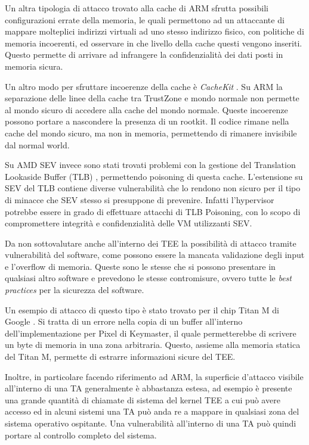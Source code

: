 \documentclass[12pt,italian]{report}
\begin{document}
	Un altra tipologia di attacco trovato alla cache di ARM \cite{aliasdriven} sfrutta possibili configurazioni errate della memoria, le quali permettono ad un attaccante di mappare molteplici indirizzi virtuali ad uno stesso indirizzo fisico, con politiche di memoria incoerenti, ed osservare in che livello della cache questi vengono inseriti. Questo permette di arrivare ad infrangere la confidenzialità dei dati posti in memoria sicura.
	
	Un altro modo per sfruttare incoerenze della cache è \textit{CacheKit} \cite{zhang2016cachekit}. Su ARM la separazione delle linee della cache tra TrustZone e mondo normale non permette al mondo sicuro di accedere alla cache del mondo normale. Queste incoerenze possono portare a nascondere la presenza di un rootkit. Il codice rimane nella cache del mondo sicuro, ma non in memoria, permettendo di rimanere invisibile dal normal world.
	
	Su AMD SEV invece sono stati trovati problemi con la gestione del Translation Lookaside Buffer (TLB) \cite{li2021tlb}, permettendo poisoning di questa cache. L'estensione su SEV del TLB contiene diverse vulnerabilità che lo rendono non sicuro per il tipo di minacce che SEV stesso si presuppone di prevenire. Infatti l'hypervisor potrebbe essere in grado di effettuare attacchi di TLB Poisoning, con lo scopo di compromettere integrità e confidenzialità delle VM utilizzanti SEV.
	
	\bigbreak 
	
	Da non sottovalutare anche all'interno dei TEE la possibilità di attacco tramite vulnerabilità del software, come possono essere la mancata validazione degli input e l'overflow di memoria. Queste sono le stesse che si possono presentare in qualsiasi altro software e prevedono le stesse contromisure, ovvero tutte le \textit{best practices} per la sicurezza del software.
	
	Un esempio di attacco di questo tipo è stato trovato per il chip Titan M di Google \cite{attack_titanM}. Si tratta di un errore nella copia di un buffer all'interno dell'implementazione per Pixel di Keymaster, il quale permetterebbe di scrivere un byte di memoria in una zona arbitraria. Questo, assieme alla memoria statica del Titan M, permette di estrarre informazioni sicure del TEE.
	
	
	Inoltre, in particolare facendo riferimento ad ARM, la superficie d'attacco visibile all'interno di una TA generalmente è abbastanza estesa, ad esempio è presente una grande quantità di chiamate di sistema del kernel TEE a cui può avere accesso ed in alcuni sistemi una TA può anda re a mappare in qualsiasi zona del sistema operativo ospitante. Una vulnerabilità all'interno di una TA può quindi portare al controllo completo del sistema.
	
\end{document}
